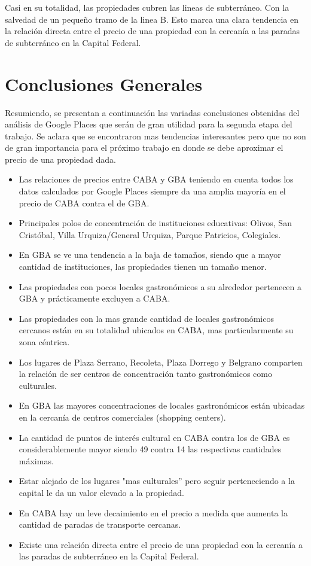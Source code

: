 \documentclass[a4paper, 10pt]{article}
\begin{document}
				Casi en su totalidad, las propiedades cubren las lineas de subterráneo. 
				Con la salvedad de un pequeño tramo de la linea B. Esto marca una clara tendencia en 
				la relación directa entre el precio de una propiedad con la cercanía a las 
				paradas de subterráneo en la Capital Federal.
				
		\section{Conclusiones Generales}
		
			Resumiendo, se presentan a continuación las variadas conclusiones obtenidas del análisis de 
			Google Places que serán de gran utilidad para la segunda etapa del trabajo. Se aclara que se 
			encontraron mas tendencias interesantes pero que no son de gran importancia para el 
			próximo trabajo en donde se debe aproximar el precio de una propiedad dada.			
			
			\begin{itemize}
				\item Las relaciones de precios entre CABA y GBA teniendo en cuenta todos los datos calculados 
				por Google Places siempre da una amplia mayoría en el precio de CABA contra el de GBA.
				\item Principales polos de concentración de instituciones educativas: Olivos, San Cristóbal, 
				Villa Urquiza/General Urquiza, Parque Patricios, Colegiales.
				\item En GBA se ve una tendencia a la baja de tamaños, siendo que a mayor 
				cantidad de instituciones, las propiedades tienen un tamaño menor.
				\item Las propiedades con pocos locales gastronómicos a su alrededor pertenecen a 
				GBA y prácticamente excluyen a CABA.
				\item Las propiedades con la mas grande cantidad de locales gastronómicos 
				cercanos están en su totalidad ubicados en CABA, mas particularmente su zona céntrica.
				\item Los lugares de Plaza Serrano, Recoleta, Plaza Dorrego y Belgrano 
				comparten la relación de ser centros de concentración tanto gastronómicos como culturales.
				\item En GBA las mayores concentraciones de locales gastronómicos están ubicadas 
				en la cercanía de centros comerciales (shopping centers).
				\item La cantidad de puntos de interés cultural en CABA contra los de GBA es 
				considerablemente mayor siendo 49 contra 14 las respectivas cantidades máximas.
				\item Estar alejado de los lugares "mas culturales” pero seguir perteneciendo 
				a la capital le da un valor elevado a la propiedad.
				\item En CABA hay un leve decaimiento en el precio a medida que aumenta la 
				cantidad de paradas de transporte cercanas.
				\item Existe una relación directa entre el precio de una propiedad con 
				la cercanía a las paradas de subterráneo en la Capital Federal.
\end{itemize}																	
			
\end{document}
